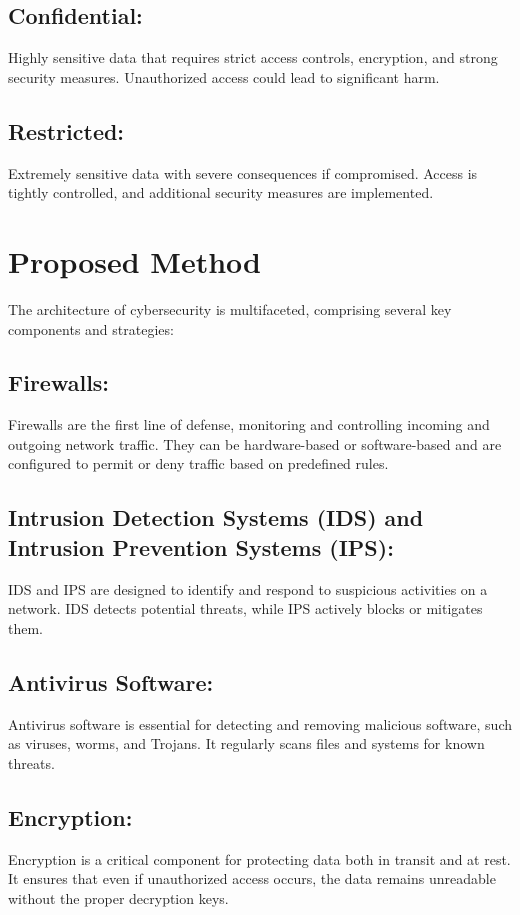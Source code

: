 \documentclass[12pt]{report}
\begin{document}
\subsection*{Confidential:}  Highly sensitive data that requires strict access controls, encryption, and strong security measures. Unauthorized access could lead to significant harm.
\subsection*{Restricted:} Extremely sensitive data with severe consequences if compromised. Access is tightly controlled, and additional security measures are implemented.


\newpage
\section*{Proposed Method}
The architecture of cybersecurity is multifaceted, comprising several key components and strategies:\cite{define}
\subsection*{Firewalls:}  Firewalls are the first line of defense, monitoring and controlling incoming and outgoing network traffic. They can be hardware-based or software-based and are configured to permit or deny traffic based on predefined rules.
\subsection*{Intrusion Detection Systems (IDS) and Intrusion Prevention Systems (IPS):}  IDS and IPS are designed to identify and respond to suspicious activities on a network. IDS detects potential threats, while IPS actively blocks or mitigates them.
\subsection*{Antivirus Software:}  Antivirus software is essential for detecting and removing malicious software, such as viruses, worms, and Trojans. It regularly scans files and systems for known threats.
\subsection*{Encryption:} Encryption is a critical component for protecting data both in transit and at rest. It ensures that even if unauthorized access occurs, the data remains unreadable without the proper decryption keys.
\end{document}
